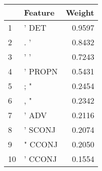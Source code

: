 \begin{tabular}{llr}
\toprule
{} &  Feature &  Weight \\
\midrule
1  &    ' DET &  0.9597 \\
2  &      . ' &  0.8432 \\
3  &      ' ' &  0.7243 \\
4  &  ' PROPN &  0.5431 \\
5  &      ; " &  0.2454 \\
6  &      , " &  0.2342 \\
7  &    ' ADV &  0.2116 \\
8  &  ' SCONJ &  0.2074 \\
9  &  " CCONJ &  0.2050 \\
10 &  ' CCONJ &  0.1554 \\
\bottomrule
\end{tabular}
